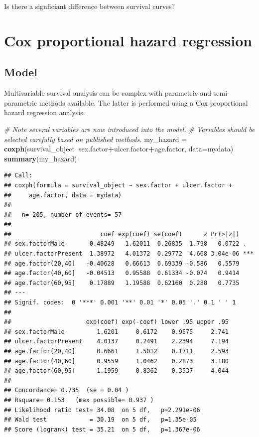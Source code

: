 \documentclass[]{book}
\makeatletter
\newenvironment{Shaded}{\begin{snugshade}}{\end{snugshade}}
\newcommand{\KeywordTok}[1]{\textcolor[rgb]{0.13,0.29,0.53}{\textbf{#1}}}
\newcommand{\DataTypeTok}[1]{\textcolor[rgb]{0.13,0.29,0.53}{#1}}
\newcommand{\StringTok}[1]{\textcolor[rgb]{0.31,0.60,0.02}{#1}}
\newcommand{\CommentTok}[1]{\textcolor[rgb]{0.56,0.35,0.01}{\textit{#1}}}
\newcommand{\OperatorTok}[1]{\textcolor[rgb]{0.81,0.36,0.00}{\textbf{#1}}}
\newcommand{\NormalTok}[1]{#1}
\newenvironment{kframe}{%
\medskip{}
\setlength{\fboxsep}{.8em}
 \def\at@end@of@kframe{}%
 \ifinner\ifhmode%
  \def\at@end@of@kframe{\end{minipage}}%
  \begin{minipage}{\columnwidth}%
 \fi\fi%
 \def\FrameCommand##1{\hskip\@totalleftmargin \hskip-\fboxsep
 \colorbox{shadecolor}{##1}\hskip-\fboxsep
     \hskip-\linewidth \hskip-\@totalleftmargin \hskip\columnwidth}%
 \MakeFramed {\advance\hsize-\width
   \@totalleftmargin\z@ \linewidth\hsize
   \@setminipage}}%
 {\par\unskip\endMakeFramed%
 \at@end@of@kframe}
\renewenvironment{Shaded}{\begin{kframe}}{\end{kframe}}
\makeatother
\begin{document}
Is there a signficiant difference between survival curves?

\section{Cox proportional hazard
regression}\label{cox-proportional-hazard-regression}

\subsection{Model}\label{model-1}

Multivariable survival analysis can be complex with parametric and
semi-parametric methods available. The latter is performed using a Cox
proportional hazard regression analysis.

\begin{Shaded}
\begin{Highlighting}[]
\CommentTok{# Note several variables are now introduced into the model. }
\CommentTok{# Variables should be selected carefully based on published methods.  }
\NormalTok{my_hazard =}\StringTok{ }\KeywordTok{coxph}\NormalTok{(survival_object}\OperatorTok{~}\NormalTok{sex.factor}\OperatorTok{+}\NormalTok{ulcer.factor}\OperatorTok{+}\NormalTok{age.factor, }\DataTypeTok{data=}\NormalTok{mydata)}
\KeywordTok{summary}\NormalTok{(my_hazard)}
\end{Highlighting}
\end{Shaded}

\begin{verbatim}
## Call:
## coxph(formula = survival_object ~ sex.factor + ulcer.factor + 
##     age.factor, data = mydata)
## 
##   n= 205, number of events= 57 
## 
##                         coef exp(coef) se(coef)      z Pr(>|z|)    
## sex.factorMale       0.48249   1.62011  0.26835  1.798   0.0722 .  
## ulcer.factorPresent  1.38972   4.01372  0.29772  4.668 3.04e-06 ***
## age.factor(20,40]   -0.40628   0.66613  0.69339 -0.586   0.5579    
## age.factor(40,60]   -0.04513   0.95588  0.61334 -0.074   0.9414    
## age.factor(60,95]    0.17889   1.19588  0.62160  0.288   0.7735    
## ---
## Signif. codes:  0 '***' 0.001 '**' 0.01 '*' 0.05 '.' 0.1 ' ' 1
## 
##                     exp(coef) exp(-coef) lower .95 upper .95
## sex.factorMale         1.6201     0.6172    0.9575     2.741
## ulcer.factorPresent    4.0137     0.2491    2.2394     7.194
## age.factor(20,40]      0.6661     1.5012    0.1711     2.593
## age.factor(40,60]      0.9559     1.0462    0.2873     3.180
## age.factor(60,95]      1.1959     0.8362    0.3537     4.044
## 
## Concordance= 0.735  (se = 0.04 )
## Rsquare= 0.153   (max possible= 0.937 )
## Likelihood ratio test= 34.08  on 5 df,   p=2.291e-06
## Wald test            = 30.19  on 5 df,   p=1.35e-05
## Score (logrank) test = 35.21  on 5 df,   p=1.367e-06
\end{verbatim}
\end{document}
